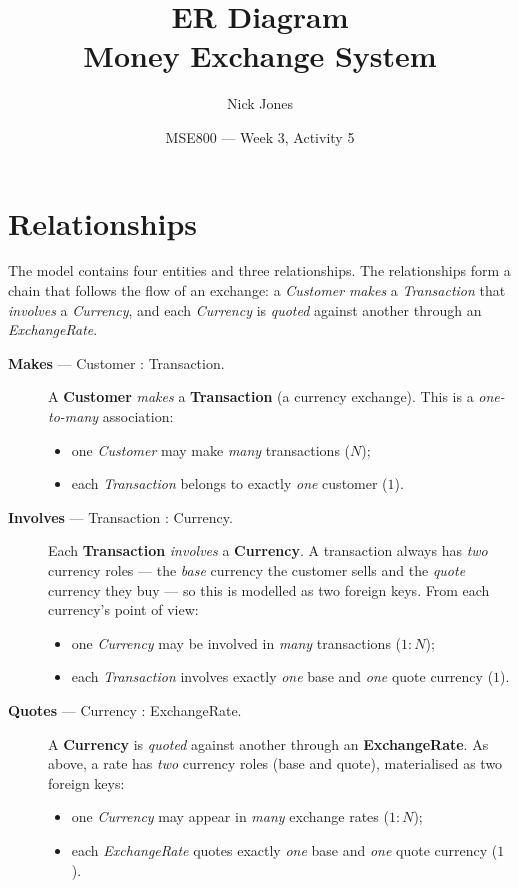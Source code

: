\documentclass[11pt]{article}
\begin{document}
\title{\textbf{ER Diagram}\\[4pt]
\large Money Exchange System}
\author{Nick Jones}
\date{MSE800 --- Week 3, Activity 5}
\maketitle

\section*{Relationships}

The model contains four entities and three relationships. The relationships form
a chain that follows the flow of an exchange: a \emph{Customer} \emph{makes} a
\emph{Transaction} that \emph{involves} a \emph{Currency}, and each
\emph{Currency} is \emph{quoted} against another through an \emph{ExchangeRate}.

\begin{description}
  \item[\textbf{Makes} --- Customer : Transaction.]
    A \textbf{Customer} \emph{makes} a \textbf{Transaction} (a currency exchange).
    This is a \emph{one-to-many} association:
    \begin{itemize}
      \item one \emph{Customer} may make \emph{many} transactions ($N$);
      \item each \emph{Transaction} belongs to exactly \emph{one} customer ($1$).
    \end{itemize}

  \item[\textbf{Involves} --- Transaction : Currency.]
    Each \textbf{Transaction} \emph{involves} a \textbf{Currency}. A transaction
    always has \emph{two} currency roles --- the \emph{base} currency the
    customer sells and the \emph{quote} currency they buy --- so this is modelled
    as two foreign keys. From each currency's point of view:
    \begin{itemize}
      \item one \emph{Currency} may be involved in \emph{many} transactions ($1:N$);
      \item each \emph{Transaction} involves exactly \emph{one} base and
            \emph{one} quote currency ($1$).
    \end{itemize}

  \item[\textbf{Quotes} --- Currency : ExchangeRate.]
    A \textbf{Currency} is \emph{quoted} against another through an
    \textbf{ExchangeRate}. As above, a rate has \emph{two} currency roles
    (base and quote), materialised as two foreign keys:
    \begin{itemize}
      \item one \emph{Currency} may appear in \emph{many} exchange rates ($1:N$);
      \item each \emph{ExchangeRate} quotes exactly \emph{one} base and
            \emph{one} quote currency ($1$).
    \end{itemize}
\end{description}
\end{document}
